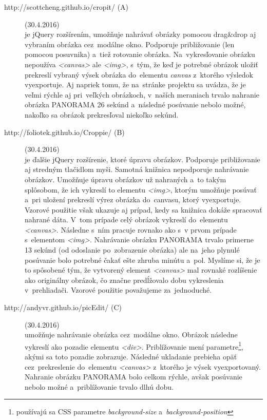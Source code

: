 \begin{description}
	
	\item[http://scottcheng.github.io/cropit/ (A)] (30.4.2016)\\
	je jQuery rozšírením, umožňuje nahrávať obrázky pomocou drag&drop aj vybraním obrázka cez~modálne okno. Podporuje približovanie (len pomocou posuvnika) a~tiež rotovanie obrázka. Na~vykresľovanie obrázku nepoužíva \emph{<canvas>} ale \emph{<img>}, s~tým, že keď je potrebné obrázok uložiť prekreslí vybraný výsek obrázka do~elementu \emph{canvas} z~ktorého výsledok vyexportuje. Aj napriek tomu, že na~stránke projektu sa uvádza, že je veľmi rýchle aj pri~veľkých obrázkoch, v~naších meraniach trvalo nahranie obrázka PANORAMA 26 sekúnd a~následné posúvanie nebolo možné, nakoľko sa obrázok prekresľoval niekoľko sekúnd.
	
	
	\item[http://foliotek.github.io/Croppie/ (B)] (30.4.2016)\\
	je ďalšie jQuery rozšírenie, ktoré úpravu obrázkov. Podporuje približovanie aj stredným tlačidlom myši. Samotná knižnica nepodporuje nahrávanie obrázkov. Umožňuje úpravu obrázkov už nahraných a~to takým splôsobom, že ich vykreslí to elementu \emph{<img>}, ktorým umožňuje posúvať a~pri uložení prekreslí výrez obrázka do~canvasu, ktorý vyexportuje. Vzorové použitie však ukazuje aj prípad, kedy sa knižnica dokáže spracovať nahrané dáta. V~tom prípade celý obrázok vykreslí do~elementu \emph{<canvas>}. Následne s~ním pracuje rovnako ako s~v prvom prípade s~elementom \emph{<img>}. Nahrávanie obrázku PANORAMA trvalo primerne 13 sekúnd (od odoslanie po~zobrazenie obrázka) ale na~jeho plynulé posúvanie bolo potrebné čakať ešte zhruba minútu a~pol. Myslíme si, že je to spôsobené tým, že vytvorený element \emph{<canvas>} mal rovnaké rozlíšenie ako originálny obrázok, čo značne predĺžovalo dobu vykreslenia v~prehliadači. Vzorové použitie považujeme za~jednoduché.
	
	
	\item[http://andyvr.github.io/picEdit/ (C)] (30.4.2016)\\
	umožňuje nahrávanie obrázka cez~modálne okno. Obrázok následne vykreslí ako pozadie elementu \emph{<div>}. Priblížovanie mení parametre\footnote{používajú sa CSS parametre \emph{background-size} a~\emph{background-position}}, akými sa toto pozadie zobrazuje. Následné ukladanie prebieha opäť cez~prekreslenie do~elementu \emph{<canvas>} z~ktorého je výsek vyexportovaný. Nahranie obrázku PANORAMA bolo celkom rýchle, avšak posúvanie nebolo možné a~priblížovanie trvalo dlhú dobu.
	

\end{description}
